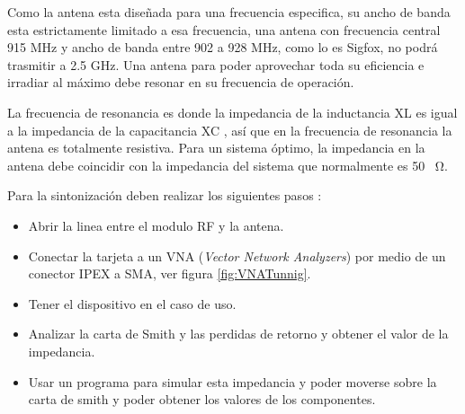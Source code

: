 Como la antena esta diseñada para una frecuencia especifica, su ancho de banda esta estrictamente limitado a esa frecuencia, una antena con frecuencia central 915 MHz y ancho de banda entre 902 a 928 MHz, como lo es Sigfox, no podrá trasmitir a 2.5 GHz. Una antena para poder aprovechar toda su eficiencia e irradiar al máximo debe resonar en su frecuencia de operación.

La frecuencia de resonancia es donde la impedancia de la inductancia XL es igual a la impedancia de la capacitancia XC , así que en la frecuencia de resonancia la antena es totalmente resistiva. 
Para un sistema óptimo, la impedancia en la antena debe coincidir con la impedancia del sistema que normalmente es 50 \SI{}{\ohm}.

Para la sintonización deben realizar los siguientes pasos :

\begin{itemize}
    \item Abrir la linea entre el modulo RF y la antena.
    \item Conectar la tarjeta a un VNA (\textit{Vector Network Analyzers}) por medio de un conector IPEX  a SMA, ver figura \ref{fig:VNATunnig}.
    \item Tener el dispositivo en el caso de uso.
    \item Analizar la carta de Smith y las perdidas de retorno y obtener el valor de la impedancia.
    \item Usar un programa para simular esta impedancia y poder moverse sobre la carta de smith y poder obtener los valores de los componentes.
\end{itemize}


